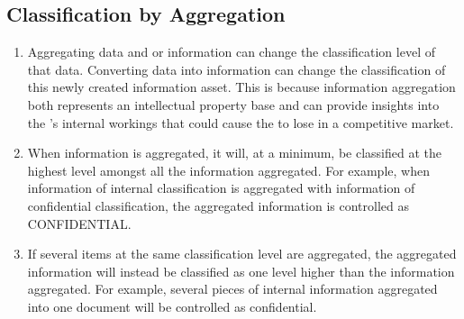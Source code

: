 \documentclass[../main.tex]{subfiles}
\begin{document}
\subsection{Classification by Aggregation}
\begin{enumerate}
    \item Aggregating data and or information can change the classification level of that data. Converting data into information can change the classification of
    this newly created information asset. This is because information aggregation both represents an intellectual property base and can provide insights into the \CompanyName’s internal
    workings that could cause the \CompanyName{} to lose in a competitive market.
    \item When information is aggregated, it will, at a minimum, be classified at the highest level amongst all the information aggregated. For example, when information of internal
    classification is aggregated with information of confidential classification, the aggregated information is controlled as CONFIDENTIAL.
    \item If several items at the same classification level are aggregated, the aggregated information will instead be classified as one level higher than the information aggregated.
    For example, several pieces of internal information aggregated into one document will be controlled as confidential.
\end{enumerate}
\end{document}
